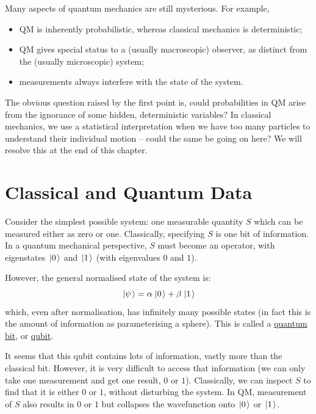 \documentclass[../Main.tex]{subfiles}
\begin{document}
Many aspects of quantum mechanics are still mysterious. For example,
\begin{itemize}
    \item QM is inherently probabilistic, whereas classical mechanics is deterministic;
    \item QM gives special status to a (usually macroscopic) observer, as distinct from the (usually microscopic) system;
    \item measurements always interfere with the state of the system.
\end{itemize}
The obvious question raised by the first point is, could probabilities in QM arise from the ignorance of some hidden, deterministic variables? In classical mechanics, we use a statistical interpretation when we have too many particles to understand their individual motion -- could the same be going on here? We will resolve this at the end of this chapter.
\section{Classical and Quantum Data}
Consider the simplest possible system: one measurable quantity $S$ which can be measured either as zero or one. Classically, specifying $S$ is one bit of information. In a quantum mechanical perspective, $S$ must become an operator, with eigenstates $\left.\left|0\right.\right\rangle$ and $\left.\left|1\right.\right\rangle$ (with eigenvalues $0$ and $1$).

However, the general normalised state of the system is:
\begin{equation*}
    \left.\left|\psi\right.\right\rangle = \alpha \left.\left|0\right.\right\rangle + \beta \left.\left|1\right.\right\rangle
\end{equation*}
which, even after normalisation, has infinitely many possible states (in fact this is the amount of information as parameterising a sphere). This is called a \underline{quantum bit}, or \underline{qubit}.

It seems that this qubit contains lots of information, vastly more than the classical bit. However, it is very difficult to access that information (we can only take one measurement and get one result, $0$ or $1$). Classically, we can inspect $S$ to find that it is either $0$ or $1$, without disturbing the system. In QM, measurement of $S$ also results in $0$ or $1$ but collapses the wavefunction onto $\left.\left|0\right.\right\rangle$ or $\left.\left|1\right.\right\rangle$.
\end{document}
